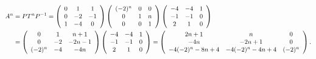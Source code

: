 {\begin{enumerate}
{\begin{align*}\ensuremath
A^n&=PT^nP^{-1}=\left(
\begin{array}{ccc}
0&1&1\\
0&-2&-1\\
1&-4&0
\end{array}
\right)\left(
 \begin{array}{ccc}
 (-2)^n&0&0\\
 0&1&n\\
 0&0&1
 \end{array}
 \right)\left(
\begin{array}{ccc}
-4&-4&1\\
-1&-1&0\\
2&1&0
\end{array}
\right)\\
 &= \left(
\begin{array}{ccc}
0&1&n+1\\
0&-2&-2n-1\\
(-2)^n&-4&-4n
\end{array}
\right)\left(
\begin{array}{ccc}
-4&-4&1\\
-1&-1&0\\
2&1&0
\end{array}
\right)=\left(
\begin{array}{ccc}
2n+1&n&0\\
-4n&-2n+1&0\\
-4(-2)^n-8n+4&-4(-2)^n-4n+4&(-2)^n
\end{array}
\right).
\end{align*}

\begin{center}
\end{center}}
\end{enumerate}
}